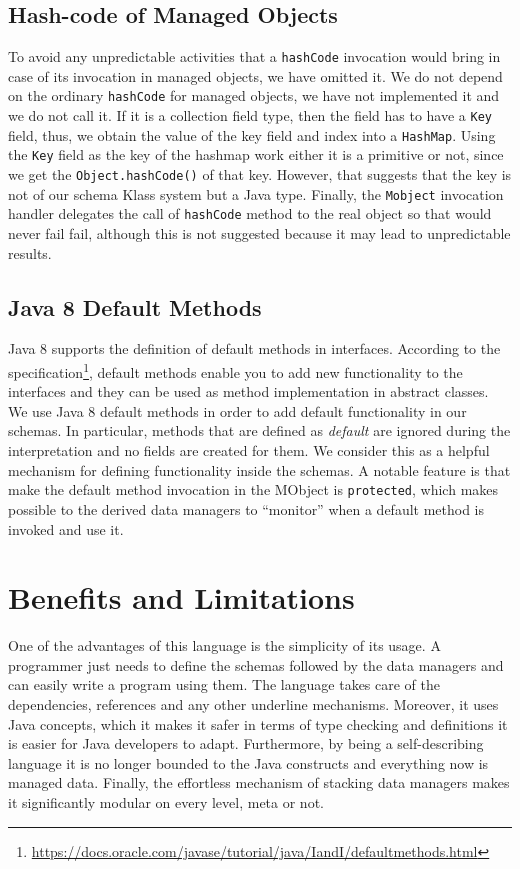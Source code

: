 \subsection{Hash-code of Managed Objects}\label{Hashcode of Managed Objects}
To avoid any unpredictable activities that a \texttt{hashCode} invocation would bring in case of its invocation in managed objects, we have omitted it. 
We do not depend on the ordinary \texttt{hashCode} for managed objects, we have not implemented it and we do not call it. 
If it is a collection field type, then the field has to have a \texttt{Key} field, thus, we obtain the value of the key field and index into a \texttt{HashMap}. 
Using the \texttt{Key} field as the key of the hashmap work either it is a primitive or not, since we get the \texttt{Object.hashCode()} of that key.
However, that suggests that the key is not of our schema Klass system but a Java type.
Finally, the \texttt{Mobject} invocation handler delegates the call of \texttt{hashCode} method to the real object so that would never fail fail, although this is not suggested because it may lead to unpredictable results.

\subsection{Java 8 Default Methods}\label{Java 8 Default Methods}
Java 8 supports the definition of default methods in interfaces.
According to the specification\footnote{\url{https://docs.oracle.com/javase/tutorial/java/IandI/defaultmethods.html}}, default methods enable you to add new functionality to the interfaces and they can be used as method implementation in abstract classes.
We use Java 8 default methods in order to add default functionality in our schemas. 
In particular, methods that are defined as \textit{default} are ignored during the interpretation and no fields are created for them.
We consider this as a helpful mechanism for defining functionality inside the schemas.
A notable feature is that make the default method invocation in the MObject is \texttt{protected}, which makes possible to the derived data managers to ``monitor'' when a default method is invoked and use it.

\section{Benefits and Limitations}\label{Benefits and Limitations}
One of the advantages of this language is the simplicity of its usage. 
A programmer just needs to define the schemas followed by the data managers and can easily write a program using them.
The language takes care of the dependencies, references and any other underline mechanisms.
Moreover, it uses Java concepts, which it makes it safer in terms of type checking and definitions it is easier for Java developers to adapt.
Furthermore, by being a self-describing language it is no longer bounded to the Java constructs and everything now is managed data.
Finally, the effortless mechanism of stacking data managers makes it significantly modular on every level, meta or not.

